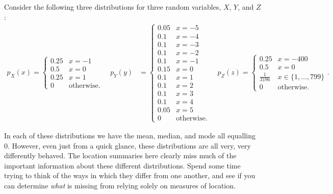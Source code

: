 \documentclass[
  letterpaper,
  DIV=11,
  numbers=noendperiod]{scrreprt}
\theoremstyle{definition}
\theoremstyle{definition}
\theoremstyle{definition}
\theoremstyle{remark}
\begin{document}
\begin{tcolorbox}[enhanced jigsaw, coltitle=black, colframe=quarto-callout-warning-color-frame, colbacktitle=quarto-callout-warning-color!10!white, bottomrule=.15mm, opacitybacktitle=0.6, colback=white, toptitle=1mm, arc=.35mm, leftrule=.75mm, bottomtitle=1mm, opacityback=0, breakable, rightrule=.15mm, title={Equal Location Across Different Distributions}, left=2mm, titlerule=0mm, toprule=.15mm]

Consider the following three distributions for three random variables,
\(X\), \(Y\), and \(Z\): \begin{align*}
p_X(x) = \begin{cases}
    0.25 & x = -1 \\
    0.5 & x = 0 \\ 
    0.25 & x = 1 \\
    0 & \text{otherwise}.
\end{cases} \quad
p_Y(y) &= \begin{cases}
    0.05 & x = -5 \\
    0.1 & x = -4 \\
    0.1 & x = -3 \\
    0.1 & x = -2\\
    0.1 & x = -1\\
    0.15 & x = 0 \\ 
    0.1 & x = 1\\
    0.1 & x = 2\\
    0.1 & x = 3\\
    0.1 & x = 4 \\
    0.05 & x = 5 \\
    0 & \text{otherwise}.
\end{cases} \quad
p_Z(z) = \begin{cases}
    0.25 & x = -400 \\
    0.5 & x = 0 \\
    \frac{1}{3196} & x \in \{1,\dots,799\}\\
    0 & \text{otherwise}.
\end{cases}.
\end{align*}

In each of these distributions we have the mean, median, and mode all
equalling \(0\).\footnotemark{} However, even just from a quick glance,
these distributions are all very, very differently behaved. The location
summaries here clearly miss much of the important information about
these different distributions. Spend some time trying to think of the
ways in which they differ from one another, and see if you can determine
\emph{what} is missing from relying solely on measures of location.

\end{tcolorbox}
\end{document}
